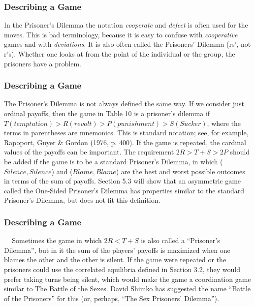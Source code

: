  \begin{frame}[fragile]\frametitle{Describing a Game}
  In  the {   Prisoner's Dilemma} the notation {\it cooperate} and {\it
defect} is often used for the moves. This is bad terminology, because it is
easy to confuse with {\it cooperative} games and with {\it deviations}. It is
also often called  the { Prisoners'   Dilemma} (rs', not r's). Whether one looks
at from the point of the individual or the group, the prisoners have a problem.

\end{frame}
 \begin{frame}[fragile]\frametitle{Describing a Game}
 
  The  {  Prisoner's Dilemma} is not always defined the same way.  If we
consider just ordinal payoffs, then the game in Table  10 is a { prisoner's
dilemma}  if $T (temptation) > R (revolt) > P (punishment) > S (Sucker)$, where
the terms in parentheses are mnemonics. This is standard notation; see, for
example,   Rapoport, Guyer \& Gordon (1976, p. 400).      If the game is
repeated, the cardinal values of the payoffs can be important. The requirement
$2R>T+S>2P$ should be added if the game is to be a standard {Prisoner's
Dilemma}, in which ($Silence, Silence $) and ($Blame, Blame    $) are the best
and worst possible outcomes in terms of the sum of payoffs. Section 5.3  will
show that an asymmetric game called the {One-Sided Prisoner's Dilemma}  has
properties similar to the standard { Prisoner's Dilemma}, but does not fit this
definition.

\end{frame}
 \begin{frame}[fragile]\frametitle{Describing a Game}
 
$\;\;\;$ Sometimes the game in which $2R< T+S$ is also called a ``Prisoner's
Dilemma'', but  in it   the sum of the players' payoffs is maximized when one
blames the other and the other is silent. If the game were repeated  or the
prisoners could use the correlated equilibria defined in Section 3.2, they would
prefer taking turns being silent, which would make the game a coordination game
similar to  The  { Battle of the Sexes}. David Shimko has suggested the name
``Battle of the Prisoners''  for this (or, perhaps,     ``The Sex Prisoners'
Dilemma'').

\end{frame}
